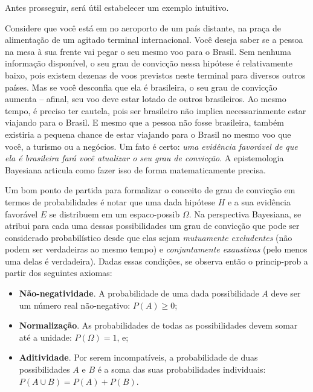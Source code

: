 \documentclass[./main.tex]{subfiles}
\begin{document}
\par Antes prosseguir, será útil estabelecer um exemplo intuitivo. 

\par Considere que você está em no aeroporto de um país distante, na praça de alimentação de um agitado terminal internacional. Você deseja saber se a pessoa na mesa à sua frente vai pegar o seu mesmo voo para o Brasil. Sem nenhuma informação disponível, o seu grau de convicção nessa hipótese é relativamente baixo, pois existem dezenas de voos previstos neste terminal para diversos outros países. Mas se você desconfia que ela é brasileira, o seu grau de convicção aumenta – afinal, seu voo deve estar lotado de outros brasileiros. Ao mesmo tempo, é preciso ter cautela, pois ser brasileiro não implica necessariamente estar viajando para o Brasil. E mesmo que a pessoa não fosse brasileira, também existiria a pequena chance de estar viajando para o Brasil no mesmo voo que você, a turismo ou a negócios. Um fato é certo: \textit{uma evidência favorável de que ela é brasileira fará você atualizar o seu grau de convicção}. A epistemologia Bayesiana articula como fazer isso de forma matematicamente precisa.

\par Um bom ponto de partida para formalizar o conceito de grau de convicção em termos de probabilidades é notar que uma dada hipótese $H$ e a sua evidência favorável $E$ se distribuem em um \gls{espaco-possib} $\Omega$. Na perspectiva Bayesiana, se atribui para cada uma dessas possibilidades um grau de convicção que pode ser considerado probabilístico desde que elas sejam \textit{mutuamente excludentes} (não podem ser verdadeiras ao mesmo tempo) e \textit{conjuntamente exaustivas} (pelo menos uma delas é verdadeira). Dadas essas condições, se observa então o \gls{princip-prob} a partir dos seguintes axiomas:
\begin{itemize}
    \item \textbf{Não-negatividade}. A probabilidade de uma dada possibilidade $A$ deve ser um número real não-negativo: $P(A) \geq 0$;
    \item \textbf{Normalização}. As probabilidades de todas as possibilidades devem somar até a unidade: $P(\Omega) = 1$, e;
    \item \textbf{Aditividade}. Por serem incompatíveis, a probabilidade de duas possibilidades $A$ e $B$ é a soma das suas probabilidades individuais: $P(A \cup B ) = P(A) + P(B)$.
\end{itemize}
\end{document}
